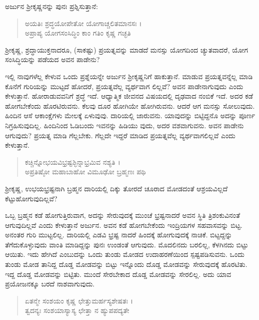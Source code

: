 ಅರ್ಜುನ ಶ್ರೀಕೃಷ್ಣನನ್ನು ಪುನಃ ಪ್ರಶ್ನಿಸುತ್ತಾನೆ:

\begin{verse}
ಅಯತಿಃ ಶ್ರದ್ಧಯೋಪೇತೋ ಯೋಗಾಚ್ಚಲಿತಮಾನಸಃ ।\\ಅಪ್ರಾಪ್ಯ ಯೋಗಸಂಸಿದ್ಧಿಂ ಕಾಂ ಗತಿಂ ಕೃಷ್ಣ ಗಚ್ಛತಿ 
\end{verse}

{\small ಶ್ರೀಕೃಷ್ಣ, ಶ್ರದ್ಧಾಯುಕ್ತನಾದರೂ, (ಸಾಕಷ್ಟು) ಪ್ರಯತ್ನವನ್ನು ಮಾಡದೆ ಮನಸ್ಸು ಯೋಗದಿಂದ ಚ್ಯುತವಾದರೆ, ಯೋಗ ಸಂಸಿದ್ಧಿಯನ್ನು ಪಡೆಯದ ಅವನ ಪಾಡೇನು?}

ಇಲ್ಲಿ ನಾವುಗಳೆಲ್ಲ ಕೇಳುವ ಒಂದು ಪ್ರಶ್ನೆಯನ್ನೇ ಅರ್ಜುನ ಶ್ರೀಕೃಷ್ಣನಿಗೆ ಹಾಕುತ್ತಾನೆ. ಮಾಡುವ ಪ್ರಯತ್ನವನ್ನೆಲ್ಲ ಮಾಡಿ ಕೊನೆಗೆ ಗುರಿಯನ್ನು ಮುಟ್ಟದೆ ಹೋದರೆ, ಪ್ರಯತ್ನವೆಲ್ಲ ವ್ಯರ್ಥವಾಗ ಲಿಲ್ಲವೆ? ಅವನ ಪಾಡೇನಾಗುವುದು ಎಂದು ಕೇಳುತ್ತಾನೆ. ಹೋರಾಡುವವನಿಗೆ ಶ್ರದ್ಧೆ ಇದೆ. ಆಧ್ಯಾತ್ಮಿಕ ಜೀವನದ ವಿಷಯದಲ್ಲಿ ದೃಢವಾದ ನಂಬಿಕೆ ಇದೆ. ಅದರ ಕಡೆ ಹೋಗಬೇಕೆಂದು ಹೊರಟಿರುವನು. ಕೆಲವು ದೂರ ಹೋಗಿಯೇ ಹೋಗಿರುವನು. ಆದರೆ ಆಗ ಮನಸ್ಸು ಸೋಲುವುದು. ಹಿಂದಿನ ಆಸೆ ಆಕಾಂಕ್ಷೆಗಳು ಮೇಲಕ್ಕೆ ಏಳುವುವು. ದಾರಿಯಲ್ಲಿ ಜಾರುವನು. ಯಾವುದನ್ನು ಬಿಟ್ಟಿದ್ದನೊ ಅದನ್ನು ಪೂರ್ಣ ನಿಗ್ರಹಿಸುವುದಿಲ್ಲ. ಹಿಂದಿನಿಂದ ಓಡಿಬಂದು ಇವನನ್ನು ಹಿಡಿಯು ವುದು, ಅದರ ವಶವಾಗುವನು. ಅವನ ಪಾಡೇನು ಆಗುವುದು? ಪ್ರಯತ್ನ ಮಾಡಿ ಗೆಲ್ಲಬೇಕು. ಗೆಲ್ಲದೇ ಇದ್ದರೆ ಮಾಡಿದ ಪ್ರಯತ್ನವೆಲ್ಲ ವ್ಯರ್ಥವಾಗಲಿಲ್ಲವೆ ಎಂದು ಕೇಳುತ್ತಾನೆ.

\begin{verse}
ಕಚ್ಚಿನ್ನೋಭಯವಿಭ್ರಷ್ಟಶ್ಛಿನ್ನಾಭ್ರಮಿವ ನಶ್ಯತಿ ।\\ಅಪ್ರತಿಷ್ಠೋ ಮಹಾಬಾಹೋ ವಿಮೂಢೋ ಬ್ರಹ್ಮಣಃ ಪಥಿ 
\end{verse}

{\small ಶ್ರೀಕೃಷ್ಣ, ಉಭಯಭ್ರಷ್ಟನಾಗಿ ಬ್ರಹ್ಮನ ದಾರಿಯಲ್ಲಿ ದಿಕ್ಕು ತೋರದೆ ಚೂರಾದ ಮೋಡದಂತೆ ಆಶ್ರಯವಿಲ್ಲದೆ ಕೆಟ್ಟುಹೋಗುವುದಿಲ್ಲವೆ?}

ಒಬ್ಬ ಬ್ರಹ್ಮನ ಕಡೆ ಹೋಗುತ್ತಿರುವಾಗ, ಅದನ್ನು ಸೇರುವುದಕ್ಕೆ ಮುಂಚೆ ಭ್ರಷ್ಟನಾದರೆ ಅವನ ಸ್ಥಿತಿ ತ್ರಿಶಂಕುವಿನಂತೆ ಆಗುವುದಿಲ್ಲವೆ ಎಂದು ಕೇಳುತ್ತಾನೆ ಅರ್ಜುನ. ಅವನ ಕಡೆ ಹೋಗಬೇಕೆಂದು ಇಂದ್ರಿಯಗಳ ಸಹವಾಸವನ್ನು ಬಿಟ್ಟ. ಅನಂತರ ಗುರಿ ಮುಟ್ಟಲಿಲ್ಲ. ದಾರಿಯಲ್ಲಿ ಎಡವಿ ಭ್ರಷ್ಟ ನಾದರೆ ಹಿಂದಕ್ಕೆ ಹೋಗುವುದಕ್ಕೆ ನಾಚಿಕೆ. ಬಿಟ್ಟದ್ದನ್ನು ತೆಗೆದುಕೊಳ್ಳುವುದು ವಾಂತಿ ಮಾಡಿದ್ದನ್ನು ಪುನಃ ಉಂಡಂತೆ ಆಗುವುದು. ಮೊದಲಿನದು ಬರಲಿಲ್ಲ, ಕೆಳಗಿನದು ಬಿಟ್ಟು ಆಯಿತು. ಇದು ಹೇಗಿದೆ ಎಂಬುದನ್ನು ಒಂದು ತುಂಡು ಮೋಡದ ಉದಾಹರಣೆಯಿಂದ ಸ್ಪಷ್ಟಪಡಿಸುವನು. ಒಂದು ತುಂಡು ಮೋಡ ತಾನಿದ್ದ ದೊಡ್ಡ ಮೋಡವನ್ನು ಬಿಟ್ಟು ಇನ್ನೊಂದು ದೊಡ್ಡ ಮೋಡವನ್ನು ಸೇರುವುದಕ್ಕೆ ಹೊರಟಿತು. ಇದ್ದ ದೊಡ್ಡ ಮೋಡವನ್ನು ಬಿಟ್ಟಿತು. ಮುಂದೆ ಸೇರಬೇಕಾದ ದೊಡ್ಡ ಮೋಡವನ್ನು ಸೇರಲಿಲ್ಲ. ಅದು ಯಾವ ಪ್ರಯೋಜನಕ್ಕೂ ಬರದೆ ನಾಶವಾಗುವುದು.

\begin{verse}
ಏತನ್ಮೇ ಸಂಶಯಂ ಕೃಷ್ಣ ಛೇತ್ತುಮರ್ಹಸ್ಯಶೇಷತಃ ।\\ತ್ವದನ್ಯಃ ಸಂಶಯಾಸ್ಯಾಸ್ಯ ಛೇತ್ತಾ ನ ಹ್ಯುಪಪದ್ಯತೇ 
\end{verse}

